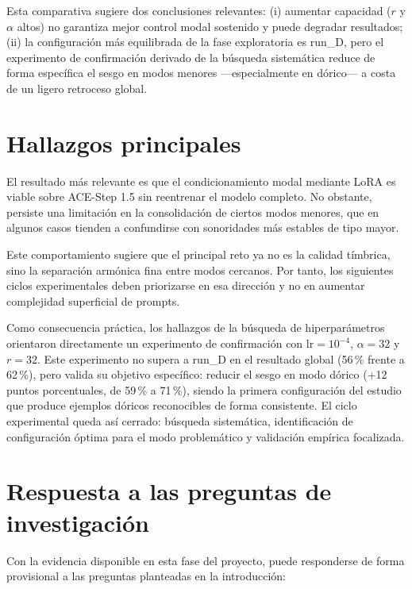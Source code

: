 \documentclass[%
    school=etsisi,%
    type=pfg,%
    degree=61CD,%
]{upm-report}
\begin{document}
Esta comparativa sugiere dos conclusiones relevantes: (i) aumentar capacidad ($r$ y $\alpha$ altos) no garantiza mejor control modal sostenido y puede degradar resultados; (ii) la configuraci\'on m\'as equilibrada de la fase exploratoria es run\_D, pero el experimento de confirmaci\'on derivado de la b\'usqueda sistem\'atica reduce de forma espec\'ifica el sesgo en modos menores ---especialmente en d\'orico--- a costa de un ligero retroceso global.

\section{Hallazgos principales}

El resultado m\'as relevante es que el condicionamiento modal mediante LoRA es viable sobre ACE-Step 1.5 sin reentrenar el modelo completo. No obstante, persiste una limitaci\'on en la consolidaci\'on de ciertos modos menores, que en algunos casos tienden a confundirse con sonoridades m\'as estables de tipo mayor.

Este comportamiento sugiere que el principal reto ya no es la calidad t\'imbrica, sino la separaci\'on arm\'onica fina entre modos cercanos. Por tanto, los siguientes ciclos experimentales deben priorizarse en esa direcci\'on y no en aumentar complejidad superficial de prompts.

Como consecuencia pr\'actica, los hallazgos de la b\'usqueda de hiperpar\'ametros orientaron directamente un experimento de confirmaci\'on con $\text{lr} = 10^{-4}$, $\alpha = 32$ y $r = 32$. Este experimento no supera a run\_D en el resultado global (56\,\% frente a 62\,\%), pero valida su objetivo espec\'ifico: reducir el sesgo en modo d\'orico (+12 puntos porcentuales, de 59\,\% a 71\,\%), siendo la primera configuraci\'on del estudio que produce ejemplos d\'oricos reconocibles de forma consistente. El ciclo experimental queda as\'i cerrado: b\'usqueda sistem\'atica, identificaci\'on de configuraci\'on \'optima para el modo problem\'atico y validaci\'on emp\'irica focalizada.

\section{Respuesta a las preguntas de investigaci\'on}

Con la evidencia disponible en esta fase del proyecto, puede responderse de forma provisional a las preguntas planteadas en la introducci\'on:
\end{document}
